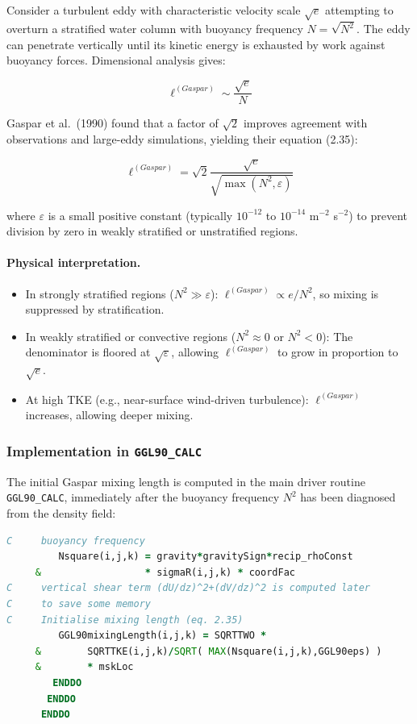 \documentclass[12pt,letterpaper]{article}
\begin{document}
Consider a turbulent eddy with characteristic velocity scale $\sqrt{e}$ attempting to overturn a stratified water column with buoyancy frequency $N = \sqrt{N^2}$. The eddy can penetrate vertically until its kinetic energy is exhausted by work against buoyancy forces. Dimensional analysis gives:

\begin{equation}
\ell^{(Gaspar)} \sim \frac{\sqrt{e}}{N}
\end{equation}

Gaspar et al.\ (1990) found that a factor of $\sqrt{2}$ improves agreement with observations and large-eddy simulations, yielding their equation (2.35):

\begin{equation}
\ell^{(Gaspar)} = \sqrt{2} \frac{\sqrt{e}}{\sqrt{\max(N^2, \varepsilon)}}
\label{eq:mxl_gaspar}
\end{equation}

where $\varepsilon$ is a small positive constant (typically $10^{-12}$ to $10^{-14}$ m$^{-2}$ s$^{-2}$) to prevent division by zero in weakly stratified or unstratified regions.

\paragraph{Physical interpretation.}
\begin{itemize}
\item In strongly stratified regions ($N^2 \gg \varepsilon$): $\ell^{(Gaspar)} \propto e/N^2$, so mixing is suppressed by stratification.
\item In weakly stratified or convective regions ($N^2 \approx 0$ or $N^2 < 0$): The denominator is floored at $\sqrt{\varepsilon}$, allowing $\ell^{(Gaspar)}$ to grow in proportion to $\sqrt{e}$.
\item At high TKE (e.g., near-surface wind-driven turbulence): $\ell^{(Gaspar)}$ increases, allowing deeper mixing.
\end{itemize}

\subsubsection{Implementation in \texttt{GGL90\_CALC}}

The initial Gaspar mixing length is computed in the main driver routine \verb|GGL90_CALC|, immediately after the buoyancy frequency $N^2$ has been diagnosed from the density field:

\begin{lstlisting}[language=Fortran,caption={(ggl90\_calc.F:L346--357) Initial mixing length estimate}]
C     buoyancy frequency
         Nsquare(i,j,k) = gravity*gravitySign*recip_rhoConst
     &                  * sigmaR(i,j,k) * coordFac
C     vertical shear term (dU/dz)^2+(dV/dz)^2 is computed later
C     to save some memory
C     Initialise mixing length (eq. 2.35)
         GGL90mixingLength(i,j,k) = SQRTTWO *
     &        SQRTTKE(i,j,k)/SQRT( MAX(Nsquare(i,j,k),GGL90eps) )
     &        * mskLoc
        ENDDO
       ENDDO
      ENDDO
\end{lstlisting}
\end{document}
